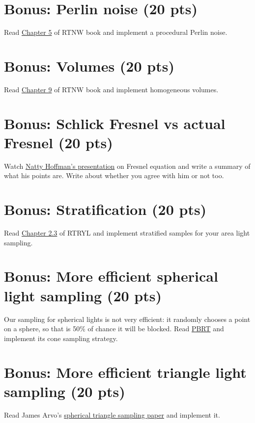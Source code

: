 \section{Bonus: Perlin noise (20 pts)}
Read \href{https://raytracing.github.io/books/RayTracingTheNextWeek.html#perlinnoise}{Chapter 5} of RTNW book and implement a procedural Perlin noise.

\section{Bonus: Volumes (20 pts)}
Read \href{https://raytracing.github.io/books/RayTracingTheNextWeek.html#volumes}{Chapter 9} of RTNW book and implement homogeneous volumes.

\section{Bonus: Schlick Fresnel vs actual Fresnel (20 pts)}
Watch \href{https://www.youtube.com/watch?v=kEcDbl7eS0w}{Natty Hoffman's presentation} on Fresnel equation and write a summary of what his points are. Write about whether you agree with him or not too.

\section{Bonus: Stratification (20 pts)}
Read \href{https://raytracing.github.io/books/RayTracingTheRestOfYourLife.html#asimplemontecarloprogram/stratifiedsamples(jittering)}{Chapter 2.3} of RTRYL and implement stratified samples for your area light sampling.

\section{Bonus: More efficient spherical light sampling (20 pts)}
Our sampling for spherical lights is not very efficient: it randomly chooses a point on a sphere, so that is 50\% of chance it will be blocked. Read \href{https://www.pbr-book.org/3ed-2018/Light_Transport_I_Surface_Reflection/Sampling_Light_Sources#x2-SamplingSpheres}{PBRT} and implement its cone sampling strategy.

\section{Bonus: More efficient triangle light sampling (20 pts)}
Read James Arvo's \href{https://dl.acm.org/doi/pdf/10.1145/218380.218500}{spherical triangle sampling paper} and implement it.

%
%


